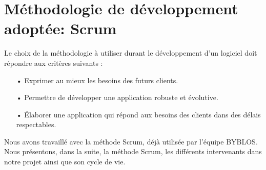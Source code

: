 \section{Méthodologie de développement adoptée: Scrum}
Le choix de la méthodologie à utiliser durant le développement d'un logiciel doit répondre aux critères suivants :
\begin{itemize}
    \item[•] Exprimer au mieux les besoins des futurs clients.
    \item[•] Permettre de développer une application robuste et évolutive.
    \item[•] Élaborer une application qui répond aux besoins des clients dans des délais respectables.
\end{itemize}
Nous avons travaillé avec la méthode Scrum, déjà utilisée par l’équipe BYBLOS. Nous présentons, dans la suite, la méthode Scrum, les différents intervenants dans notre projet ainsi que son cycle de vie.
